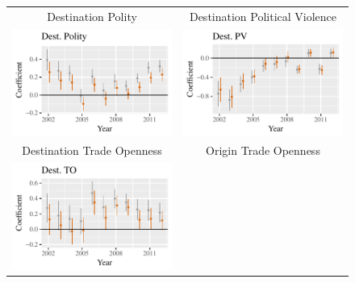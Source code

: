 \documentclass{article}
\begin{document}
\begin{figure}
\centering
\begin{tabular}{c@{\hskip -.4cm}c}
Destination Polity &
Destination Political Violence\\
\includegraphics[height=.22\textheight, clip=true, trim=0cm .5cm 0cm .1cm]{draft_figures/rl_plots/DestPolity.pdf}    &
\includegraphics[height=.22\textheight, clip=true, trim=.5cm .5cm 0cm .1cm]{draft_figures/rl_plots/DestPV.pdf}   \\
Destination Trade Openness &
Origin Trade Openness\\
\includegraphics[height=.22\textheight, clip=true, trim=0cm .5cm 0cm .1cm]{draft_figures/rl_plots/DestTO.pdf} &  

\end{tabular}
\end{figure}
\end{document}

